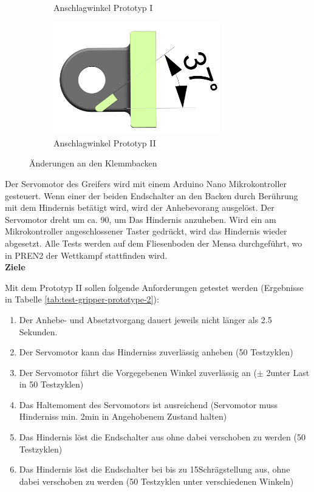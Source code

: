 \begin{figure}[H]
\begin{subfigure}{0.49\textwidth}
\caption{Anschlagwinkel Prototyp I}
\label{fig:jaw_old_section}
\end{subfigure}
\begin{subfigure}{0.49\textwidth}
\includegraphics[width=0.8\textwidth]{assets/greifer-prototyp/Backe_neu_schnitt.png}
\caption{Anschlagwinkel Prototyp II}
\label{fig:jaw_new_section}
\end{subfigure}
\caption{Änderungen an den Klemmbacken}
\label{fig:jaw_iteration}
\end{figure}

Der Servomotor des Greifers wird mit einem Arduino Nano Mikrokontroller gesteuert. Wenn einer der beiden Endschalter an den Backen durch Berührung mit dem Hindernis betätigt wird, wird der Anhebevorang ausgelöst. Der Servomotor dreht um ca. 90\textdegree,  
um Das Hindernis anzuheben. Wird ein am Mikrokontroller angeschlossener Taster gedrückt, wird das Hindernis wieder abgesetzt. Alle Tests werden auf dem Fliesenboden der Mensa durchgeführt, wo in PREN2 der Wettkampf stattfinden wird.\\

\textbf{Ziele}

Mit dem Prototyp II sollen folgende Anforderungen getestet werden (Ergebnisse in Tabelle \ref{tab:test-gripper-prototype-2}):

\begin{enumerate}
    \item Der Anhebe- und Absetztvorgang dauert jeweils nicht länger als 2.5 Sekunden.
    \item Der Servomotor kann das Hinderniss zuverlässig anheben (50 Testzyklen)
    \item Der Servomotor fährt die Vorgegebenen Winkel zuverlässig an ($\pm$ 2\textdegree unter Last in 50 Testzyklen)
    \item Das Haltemoment des Servomotors ist ausreichend (Servomotor muss Hinderniss min. 2min in Angehobenem Zustand halten)
    \item Das Hindernis löst die Endschalter aus ohne dabei verschoben zu werden (50 Testzyklen)
    \item Das Hindernis löst die Endschalter bei bis zu 15\textdegree  Schrägstellung aus, ohne dabei verschoben zu werden (50 Testzyklen unter verschiedenen Winkeln)
\end{enumerate}

